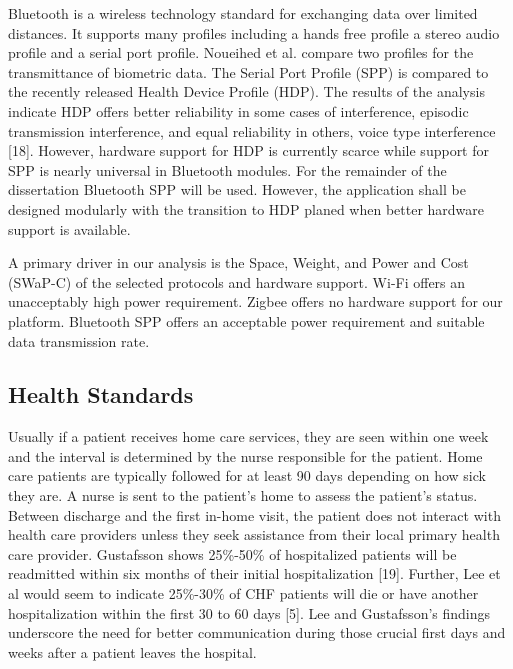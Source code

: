 Bluetooth is a wireless technology standard for exchanging data over limited distances. It supports many profiles including a hands free profile a stereo audio profile and a serial port profile. Noueihed et al. compare two profiles for the transmittance of biometric data. The Serial Port Profile (SPP) is compared to the recently released Health Device Profile (HDP). The results of the analysis indicate HDP offers better reliability in some cases of interference, episodic transmission interference, and equal reliability in others, voice type interference [18]. However, hardware support for HDP is currently scarce while support for SPP is nearly universal in Bluetooth modules. For the remainder of the dissertation Bluetooth SPP will be used. However, the application shall be designed modularly with the transition to HDP planed when better hardware support is available.

A primary driver in our analysis is the Space, Weight, and Power and Cost (SWaP-C) of the selected protocols and hardware support. Wi-Fi offers an unacceptably high power requirement. Zigbee offers no hardware support for our platform. Bluetooth SPP offers an acceptable power requirement and suitable data transmission rate.

\subsection{Health Standards}
Usually if a patient receives home care services, they are seen within one week and the interval is determined by the nurse responsible for the patient. Home care patients are typically followed for at least 90 days depending on how sick they are. A nurse is sent to the patient’s home to assess the patient’s status. Between discharge and the first in-home visit, the patient does not interact with health care providers unless they seek assistance from their local primary health care provider. Gustafsson shows 25\%-50\% of hospitalized patients will be readmitted within six months of their initial hospitalization [19]. Further, Lee et al would seem to indicate 25\%-30\% of CHF patients will die or have another hospitalization within the first 30 to 60 days [5]. Lee and Gustafsson’s findings underscore the need for better communication during those crucial first days and weeks after a patient leaves the hospital.

